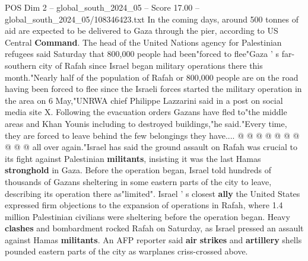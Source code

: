\begin{textsample}{POS Dim 2 – global\_south\_2024\_05 – Score 17.00 – global\_south\_2024\_05/108346423.txt}
In the coming days, around 500 tonnes of aid are expected to be delivered to Gaza through the pier, according to US Central \textbf{Command}.
The head of the United Nations agency for Palestinian refugees said Saturday that 800,000 people had been"forced to flee"Gaza ' s far-southern city of Rafah since Israel began military operations there this month."Nearly half of the population of Rafah or 800,000 people are on the road having been forced to flee since the Israeli forces started the military operation in the area on 6 May,"UNRWA chief Philippe Lazzarini said in a post on social media site X.
Following the evacuation orders Gazans have fled to"the middle areas and Khan Younis including to destroyed buildings,"he said."Every time, they are forced to leave behind the few belongings they have.... @ @ @ @ @ @ @ @ @ @ all over again."Israel has said the ground assault on Rafah was crucial to its fight against Palestinian \textbf{militants}, insisting it was the last Hamas \textbf{stronghold} in Gaza.
Before the operation began, Israel told hundreds of thousands of Gazans sheltering in some eastern parts of the city to leave, describing its operation there as"limited".
Israel ' s closest \textbf{ally} the United States expressed firm objections to the expansion of operations in Rafah, where 1.4 million Palestinian civilians were sheltering before the operation began.
Heavy \textbf{clashes} and bombardment rocked Rafah on Saturday, as Israel pressed an assault against Hamas \textbf{militants}.
An AFP reporter said \textbf{air} \textbf{strikes} and \textbf{artillery} shells pounded eastern parts of the city as warplanes criss-crossed above.

\end{textsample}
